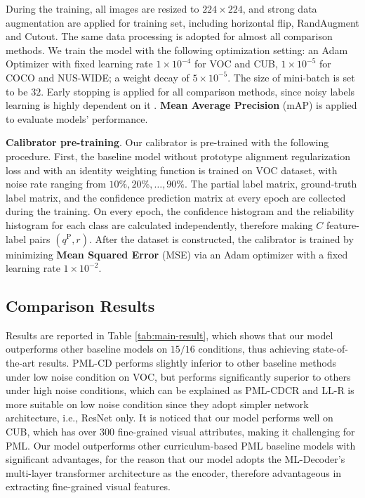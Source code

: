 \documentclass[letterpaper]{article} %
\begin{document}
  During the training, all images are resized to $224 \times 224$, and strong data augmentation are applied for training set, including horizontal flip, RandAugment \cite{Randaugment} and Cutout. The same data processing is adopted for almost all comparison methods. We train the model with the following optimization setting: an Adam Optimizer with fixed learning rate $1 \times 10^{-4}$ for VOC and CUB, $1 \times 10^{-5}$ for COCO and NUS-WIDE; a weight decay of $5 \times 10^{-5}$. The size of mini-batch is set to be $32$. Early stopping is applied for all comparison methods, since noisy labels learning is highly dependent on it \cite{EarlyStopping}.
  \textbf{Mean Average Precision} (mAP) is applied to evaluate models' performance. 

  \textbf{Calibrator pre-training}. Our calibrator is pre-trained with the following procedure. First, the baseline model without prototype alignment regularization loss and with an identity weighting function is trained on VOC dataset, with noise rate ranging from $10\%, 20\%, \dots, 90\%$. 
  The partial label matrix, ground-truth label matrix, and the confidence prediction matrix at every epoch are collected during the training. On every epoch, the confidence histogram and the reliability histogram for each class are calculated independently, therefore making \(C\) feature-label pairs $( q^\text{P}, r )$. After the dataset is constructed, the calibrator is trained by minimizing \textbf{Mean Squared Error} (MSE) via an Adam optimizer with a fixed  learning rate $1 \times 10^{-2}$. 

\subsection{Comparison Results}

  Results are reported in Table \ref{tab:main-result}, which shows that our model outperforms other baseline models on $15/16$ conditions, thus achieving state-of-the-art results. PML-CD performs slightly inferior to other baseline methods under low noise condition on VOC, but performs significantly superior to others under high noise conditions, which can be explained as PML-CDCR and LL-R is more suitable on low noise condition since they adopt simpler network architecture, i.e., ResNet only. It is noticed that our model performs well on CUB, which has over 300 fine-grained visual attributes, making it challenging for PML. Our model outperforms other curriculum-based PML baseline models with significant advantages, for the reason that our model adopts the ML-Decoder's multi-layer transformer architecture as the encoder, therefore advantageous in extracting fine-grained visual features. 
\end{document}
